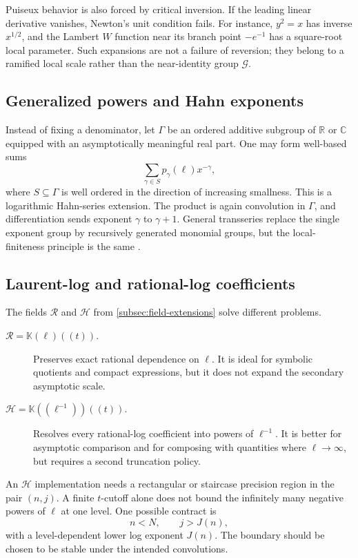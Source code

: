 \documentclass[11pt,oneside]{article}
\numberwithin{equation}{section}
\theoremstyle{definition}
\newcommand{\K}{\mathbb K}
\newcommand{\C}{\mathbb C}
\newcommand{\R}{\mathbb R}
\newcommand{\RL}{\mathscr R}
\newcommand{\HL}{\mathscr H}
\newcommand{\Gnear}{\mathscr G}
\begin{document}
Puiseux behavior is also forced by critical inversion.  If the leading
linear derivative vanishes, Newton's unit condition fails.  For instance,
\(y^2=x\) has inverse \(x^{1/2}\), and the Lambert \(W\) function near its branch
point \(-e^{-1}\) has a square-root local parameter.  Such expansions are not a
failure of reversion; they belong to a ramified local scale rather than the
near-identity group \(\Gnear\).

\subsection{Generalized powers and Hahn exponents}

Instead of fixing a denominator, let \(\Gamma\) be an ordered additive subgroup
of \(\R\) or \(\C\) equipped with an asymptotically meaningful real part.  One
may form well-based sums
\begin{equation}\label{eq:generalized-power-log}
  \sum_{\gamma\in S}p_\gamma(\ell)x^{-\gamma},
\end{equation}
where \(S\subseteq\Gamma\) is well ordered in the direction of increasing
smallness.  This is a logarithmic Hahn-series extension.  The product is again
convolution in \(\Gamma\), and differentiation sends exponent \(\gamma\) to
\(\gamma+1\).  General transseries replace the single exponent group by
recursively generated monomial groups, but the local-finiteness principle is the
same \cite{EdgarBeginners,VanDerHoeven2006}.

\subsection{Laurent-log and rational-log coefficients}

The fields \(\RL\) and \(\HL\) from
\cref{subsec:field-extensions} solve different problems.
\begin{description}
\item[\(\RL=\K(\ell)((t))\).]
Preserves exact rational dependence on \(\ell\).  It is ideal for symbolic
quotients and compact expressions, but it does not expand the secondary
asymptotic scale.
\item[\(\HL=\K((\ell^{-1}))((t))\).]
Resolves every rational-log coefficient into powers of \(\ell^{-1}\).  It is
better for asymptotic comparison and for composing with quantities where
\(\ell\to\infty\), but requires a second truncation policy.
\end{description}

An \(\HL\) implementation needs a rectangular or staircase precision region in
the pair \((n,j)\).  A finite \(t\)-cutoff alone does not bound the infinitely
many negative powers of \(\ell\) at one level.  One possible contract is
\[
  n<N,
  \qquad j>J(n),
\]
with a level-dependent lower log exponent \(J(n)\).  The boundary should be
chosen to be stable under the intended convolutions.
\end{document}
